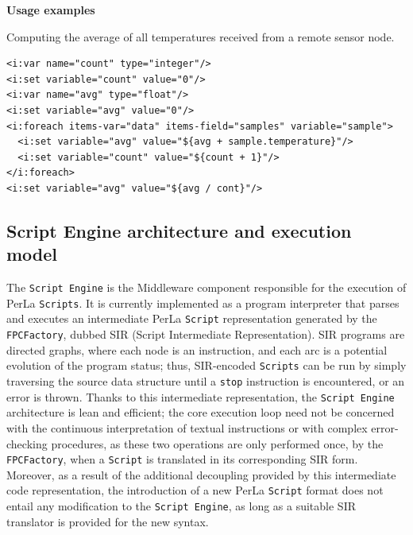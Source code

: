 \textbf{Usage examples}

Computing the average of all temperatures received from a remote sensor node.

\lstset{language=XML}
\begin{lstlisting}
<i:var name="count" type="integer"/>
<i:set variable="count" value="0"/> 
<i:var name="avg" type="float"/>
<i:set variable="avg" value="0"/>
<i:foreach items-var="data" items-field="samples" variable="sample">
  <i:set variable="avg" value="${avg + sample.temperature}"/>
  <i:set variable="count" value="${count + 1}"/>
</i:foreach>
<i:set variable="avg" value="${avg / cont}"/>
\end{lstlisting}

\subsection{Script Engine architecture and execution model}

The \texttt{Script Engine} is the Middleware component responsible for the
execution of PerLa \texttt{Scripts}. It is currently implemented as a program
interpreter that parses and executes an intermediate PerLa \texttt{Script}
representation generated by the \texttt{FPCFactory}, dubbed SIR (Script
Intermediate Representation). SIR programs are directed graphs, where each node
is an instruction, and each arc is a potential evolution of the program status;
thus, SIR-encoded \texttt{Scripts} can be run by simply traversing the source
data structure until a \texttt{stop} instruction is encountered, or an error is
thrown. Thanks to this intermediate representation, the \texttt{Script Engine}
architecture is lean and efficient; the core execution loop need not be
concerned with the continuous interpretation of textual instructions or with
complex error-checking procedures, as these two operations are only performed
once, by the \texttt{FPCFactory}, when a \texttt{Script} is translated in its
corresponding SIR form. Moreover, as a result of the additional decoupling
provided by this intermediate code representation, the introduction of a new
PerLa \texttt{Script} format does not entail any modification to the
\texttt{Script Engine}, as long as a suitable SIR translator is provided for
the new syntax.

